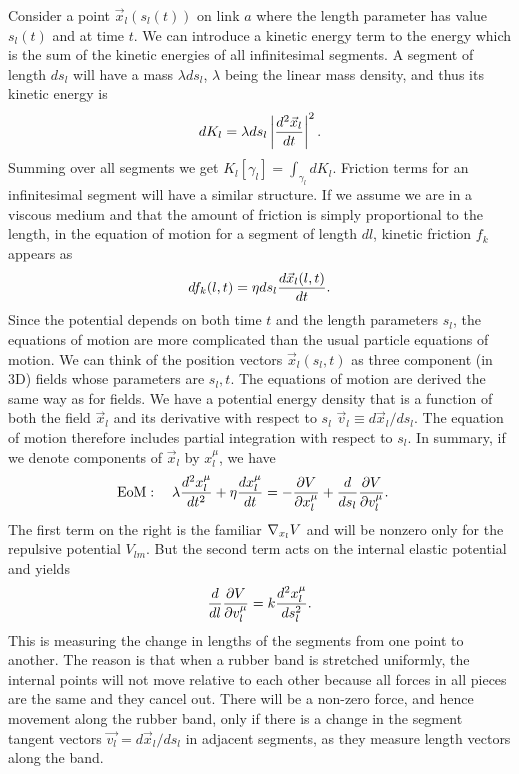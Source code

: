 \documentclass[linenumbers,endfloats,nofootinbib,preprint,floatfix,titlepage,superscriptaddress]{revtex4-1} %
\begin{document}
Consider a point $\vec{x}_l(s_l(t))$ on link $a$ where the length parameter has value $s_l(t)$ and at time $t$. We can introduce a kinetic energy term to the energy which is the sum of the kinetic energies of all infinitesimal segments.
A segment of length $ds_l$ will have a mass $\lambda ds_l $, $\lambda$ being the linear mass density, and thus its kinetic energy is
\[dK_l = \lambda ds_l \left|d^2 \vec{x}_l \over dt \right|^2.\]
Summing over all segments we get $K_l[\gamma_l] = \int_{\gamma_l} dK_l$. Friction terms for an infinitesimal segment will have a similar structure. If we assume we are in a viscous medium and that the amount of friction is simply proportional to the length, in the equation of motion for a segment of length $dl$, kinetic friction $f_k$ appears as 
\[df_k(l,t) =\eta ds_l {d\vec{x}_l(l,t)\over dt}.\] 
Since the potential depends on both time $t$ and the length parameters $s_l$, the equations of motion are more complicated than the usual particle equations of motion. 
We can think of the position vectors $\vec{x}_l (s_l,t)$ as three component (in 3D) fields whose parameters are $s_l,t$. 
The equations of motion are derived the same way as for fields. 
We have a potential energy density that is a function of both the field $\vec{x}_l$ and its derivative with respect to $s_l$  $\vec{v}_l \equiv d\vec{x}_l/ds_l$. 
The equation of motion therefore includes partial integration with respect to $s_l$. 
In summary, if we denote components of $\vec{x}_l$ by $x_l^\mu$, we have 
\begin{align}
    \mbox{EoM}:\quad \lambda {d^2 x_l^\mu \over dt^2} +\eta {dx_l^\mu \over dt} & =  -{\partial V \over \partial x_l^\mu} + {d\over ds_l} {\partial V \over \partial v_l^\mu}.   \label{eq:Langevin}
\end{align}
The first term on the right is the familiar $\nabla_{x_l} V$ and will be nonzero only for the repulsive potential $V_{lm}$. But the second term acts on the internal elastic potential and yields \[{d\over dl} {\partial V \over \partial v_l^\mu} = k {d^2 x_l^\mu \over ds_l^2}.\]  
This is measuring the change in lengths of the segments from one point to another. The reason is that when a rubber band is stretched uniformly, the internal points will not move relative to each other because all forces in all pieces are the same and they cancel out. There will be a non-zero force, and hence movement along the rubber band, only if there is a change in the segment tangent vectors $\vec{v_l} = d\vec{x}_l/ds_l$ in adjacent segments, as they measure length vectors along the band.
\end{document}
